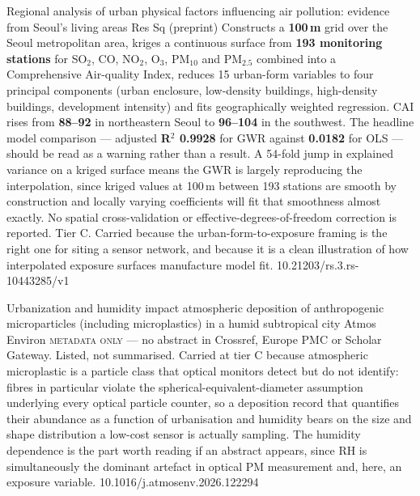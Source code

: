 \documentclass[10pt]{article}
\begin{document}
{Regional analysis of urban physical factors influencing air pollution: evidence from
Seoul's living areas}
{Res Sq (preprint)}
{Constructs a \textbf{100\,m} grid over the Seoul metropolitan area, kriges a continuous
surface from \textbf{193 monitoring stations} for SO$_2$, CO, NO$_2$, O$_3$, PM$_{10}$ and
PM$_{2.5}$ combined into a Comprehensive Air-quality Index, reduces 15 urban-form
variables to four principal components (urban enclosure, low-density buildings,
high-density buildings, development intensity) and fits geographically weighted
regression. CAI rises from \textbf{88--92} in northeastern Seoul to \textbf{96--104} in
the southwest. The headline model comparison --- adjusted \textbf{R$^2$ 0.9928} for GWR
against \textbf{0.0182} for OLS --- should be read as a warning rather than a result. A
54-fold jump in explained variance on a kriged surface means the GWR is largely
reproducing the interpolation, since kriged values at 100\,m between 193 stations are
smooth by construction and locally varying coefficients will fit that smoothness almost
exactly. No spatial cross-validation or effective-degrees-of-freedom correction is
reported. Tier C. Carried because the urban-form-to-exposure framing is the right one for
siting a sensor network, and because it is a clean illustration of how interpolated
exposure surfaces manufacture model fit.}
{10.21203/rs.3.rs-10443285/v1}

{Urbanization and humidity impact atmospheric deposition of anthropogenic microparticles
(including microplastics) in a humid subtropical city}
{Atmos Environ}
{\textsc{metadata only} --- no abstract in Crossref, Europe PMC or Scholar Gateway.
Listed, not summarised. Carried at tier C because atmospheric microplastic is a particle
class that optical monitors detect but do not identify: fibres in particular violate the
spherical-equivalent-diameter assumption underlying every optical particle counter, so a
deposition record that quantifies their abundance as a function of urbanisation and
humidity bears on the size and shape distribution a low-cost sensor is actually sampling.
The humidity dependence is the part worth reading if an abstract appears, since RH is
simultaneously the dominant artefact in optical PM measurement and, here, an exposure
variable.}
{10.1016/j.atmosenv.2026.122294}
\end{document}
